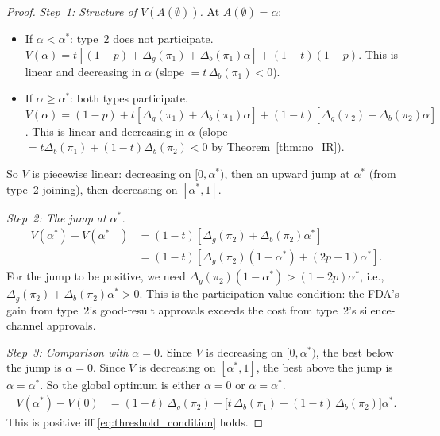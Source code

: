 \documentclass[12pt,a4paper]{article}
\begin{document}
\begin{proof}
\emph{Step~1: Structure of $V(A(\emptyset))$.}
At $A(\emptyset) = \alpha$:
\begin{itemize}
  \item If $\alpha < \alpha^*$: type~2 does not participate.
    $V(\alpha) = t[(1-p) + \Delta_g(\pi_1)
    + \Delta_b(\pi_1) \alpha] + (1-t)(1-p)$.
    This is linear and decreasing in $\alpha$ (slope
    $= t \, \Delta_b(\pi_1) < 0$).
  \item If $\alpha \geq \alpha^*$: both types participate.
    $V(\alpha) = (1-p)
    + t[\Delta_g(\pi_1) + \Delta_b(\pi_1) \alpha]
    + (1-t)[\Delta_g(\pi_2) + \Delta_b(\pi_2) \alpha]$.
    This is linear and decreasing in $\alpha$ (slope
    $= t \Delta_b(\pi_1) + (1-t) \Delta_b(\pi_2) < 0$
    by Theorem~\ref{thm:no_IR}).
\end{itemize}
So $V$ is piecewise linear: decreasing on
$[0, \alpha^*)$, then an upward jump at $\alpha^*$
(from type~2 joining), then decreasing on
$[\alpha^*, 1]$.

\medskip
\emph{Step~2: The jump at $\alpha^*$.}
\begin{align*}
  V(\alpha^*) - V(\alpha^{*-})
  &= (1-t) \left[
       \Delta_g(\pi_2) + \Delta_b(\pi_2) \alpha^*
     \right] \\
  &= (1-t) \left[
       \Delta_g(\pi_2)(1 - \alpha^*)
       + (2p-1) \alpha^*
     \right].
\end{align*}
For the jump to be positive, we need
$\Delta_g(\pi_2)(1-\alpha^*) > (1-2p)\alpha^*$, i.e.,
$\Delta_g(\pi_2) + \Delta_b(\pi_2) \alpha^* > 0$. This
is the participation value condition: the FDA's gain from
type~2's good-result approvals exceeds the cost from
type~2's silence-channel approvals.

\medskip
\emph{Step~3: Comparison with $\alpha = 0$.}
Since $V$ is decreasing on $[0, \alpha^*)$, the best
below the jump is $\alpha = 0$. Since $V$ is decreasing
on $[\alpha^*, 1]$, the best above the jump is
$\alpha = \alpha^*$. So the global optimum is either
$\alpha = 0$ or $\alpha = \alpha^*$.
\begin{align}
  V(\alpha^*) - V(0)
  &= (1-t) \, \Delta_g(\pi_2)
     + \bigl[t \, \Delta_b(\pi_1)
       + (1-t) \, \Delta_b(\pi_2)\bigr] \alpha^*.
     \label{eq:net_gain}
\end{align}
This is positive iff
\eqref{eq:threshold_condition} holds.
\end{proof}
\end{document}

